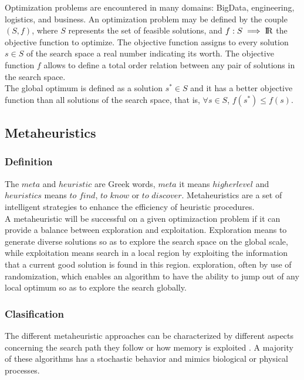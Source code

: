 Optimization problems are encountered in many domains: BigData, engineering, logistics, and business. An optimization problem may be defined by the couple $(S, f )$, where $S$ represents the set of feasible solutions, and $f : S \implies {\rm I\!R}$ the objective function to optimize. The objective function assigns to every solution
$s \in S$ of the search space a real number indicating its worth. The objective function
$f$ allows to define a total order relation between any pair of solutions in the search
space.\\

The global optimum is defined as  a solution $s^* \in S$ and it has a better objective function than all solutions of the search space, that is, $\forall  s \in  S$, $f(s^*) 	\leq f(s)$.\\

\subsection{Metaheuristics}

\subsubsection{Definition}
The $meta$ and $heuristic$ are Greek words, $meta$ it means $higher level$ and $heuristics$ means $to$ $find$, $to$ $know$ or $to$ $discover$. Metaheuristics are a set of intelligent strategies to enhance the efficiency of heuristic procedures.\\

A metaheuristic will be successful on a given optimizaction problem if it can provide a balance between exploration and exploitation. Exploration means to generate diverse solutions so as to explore the search space on the global scale, while exploitation means search in a local region by exploiting the information that a current good solution is found in this region.
exploration, often by use of randomization, which enables an algorithm to have the ability to jump out of any local optimum so as to explore the search globally.

\subsubsection{Clasification}
The different metaheuristic approaches can be characterized by different aspects concerning the search path they follow or how memory is exploited \cite{citeulike:1859945}. A majority of these algorithms has a stochastic behavior and mimics biological or  physical processes.\\

